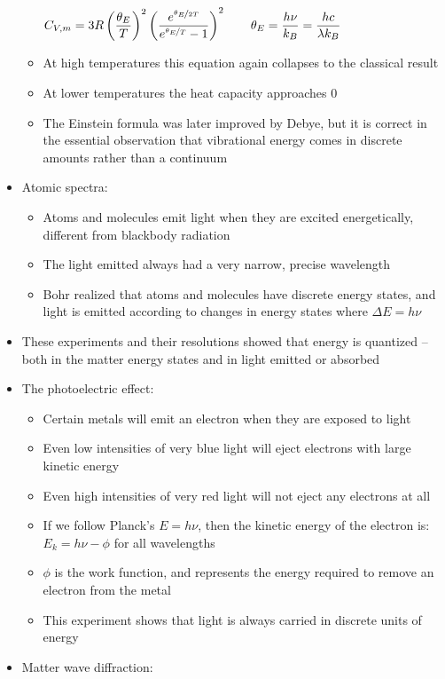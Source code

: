 \documentclass[12pt, openany, letterpaper]{memoir}
\begin{document}
\begin{itemize}
\begin{itemize}
		$C_{V,m}=3R\left(\dfrac{\theta_E}{T}\right)^2\left(\dfrac{e^{\nicefrac{\theta_E}{2T}}}{e^{\nicefrac{\theta_E}{T}}-1}\right)^2 \hspace{2em} \theta_E=\dfrac{h\nu}{k_B}=\dfrac{hc}{\lambda k_B}$
		\item At high temperatures this equation again collapses to the classical result
		\item At lower temperatures the heat capacity approaches 0
		\item The Einstein formula was later improved by Debye, but it is correct in the essential observation that vibrational energy comes in discrete amounts rather than a continuum
	\end{itemize}
	\item Atomic spectra:
	\begin{itemize}
		\item Atoms and molecules emit light when they are excited energetically, different from blackbody radiation
		\item The light emitted always had a very narrow, precise wavelength
		\item Bohr realized that atoms and molecules have discrete energy states, and light is emitted according to changes in energy states where $\Delta E = h\nu$
	\end{itemize}
	\item These experiments and their resolutions showed that energy is quantized -- both in the matter energy states and in light emitted or absorbed
	\item The photoelectric effect:
	\begin{itemize}
		\item Certain metals will emit an electron when they are exposed to light
		\item Even low intensities of very blue light will eject electrons with large kinetic energy
		\item Even high intensities of very red light will not eject any electrons at all
		\item If we follow Planck's $E=h\nu$, then the kinetic energy of the electron is: $E_k = h\nu - \phi$ for all wavelengths
		\item $\phi$ is the work function, and represents the energy required to remove an electron from the metal
		\item This experiment shows that light is always carried in discrete units of energy
	\end{itemize}
	\item Matter wave diffraction:

\end{itemize}
\end{document}
